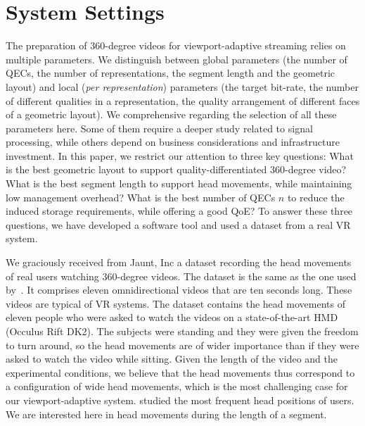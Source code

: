 \newcommand\testbitrateBudget{6}
\newcommand\testbitrateBudgetPercentage{\SI{75}{\percent}}
\section{System Settings}
\label{sec:settings}

The preparation of $360$-degree videos for viewport-adaptive streaming
relies on multiple parameters. We distinguish between global
parameters (the number of \acp{QEC}, the number of
representations, the segment length and the geometric layout)
and local (\emph{per representation}) parameters (the target bit-rate,
the number of different qualities in a representation, the quality
arrangement of different faces of a geometric layout). We  comprehensive regarding the selection of all these
parameters here. Some of them require a deeper study related to signal
processing, while others depend on business
considerations and infrastructure investment. In this paper, we
restrict our attention to three key questions: What is the best
geometric layout to support quality-differentiated $360$-degree video?
What is the best segment length to support head movements, while
maintaining low management overhead? What is the best number of
\acp{QEC} $n$ to reduce the induced storage requirements, while
offering a good \ac{QoE}? To answer these three questions, we have
developed a software tool and used a dataset from a real \ac{VR} system.


We graciously received from Jaunt, Inc a dataset
recording the head movements of real users watching $360$-degree videos.
The dataset is the same as the one used by~\citet{yu_framework_2015}. It comprises
eleven omnidirectional videos that are ten seconds long. These videos
are typical of \ac{VR} systems. The dataset contains
the head movements of eleven people who were asked to watch the videos
on a state-of-the-art \ac{HMD} (Occulus Rift DK2). The subjects were
standing and they were given the freedom to turn around, so the head
movements are of wider importance than if they were asked to watch the
video while sitting. Given the length of the video and the
experimental conditions, we believe that the head movements thus
correspond to a configuration of wide head movements, which
is the most challenging case for our viewport-adaptive
system. \citet{yu_framework_2015} studied the most frequent head
positions of users. We are interested here in head movements
during the length of a segment.

